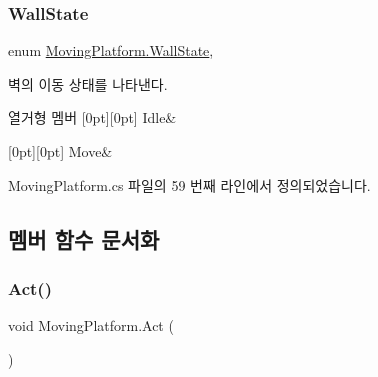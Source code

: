 \subsubsection{\texorpdfstring{WallState}{WallState}}
{\footnotesize\ttfamily enum \mbox{\hyperlink{class_moving_platform_ac47e764b71989317aab0bad26d82a901}{Moving\+Platform.\+Wall\+State}}\hspace{0.3cm}{\ttfamily [strong]}, {\ttfamily [private]}}



벽의 이동 상태를 나타낸다. 

\begin{DoxyEnumFields}{열거형 멤버}
[0pt][0pt]{}\mbox{\label{class_moving_platform_ac47e764b71989317aab0bad26d82a901ae599161956d626eda4cb0a5ffb85271c}} 
Idle&\\
\hline

[0pt][0pt]{}\mbox{\label{class_moving_platform_ac47e764b71989317aab0bad26d82a901a6bc362dbf494c61ea117fe3c71ca48a5}} 
Move&\\
\hline

\end{DoxyEnumFields}


Moving\+Platform.\+cs 파일의 59 번째 라인에서 정의되었습니다.


\begin{DoxyCode}{0}

\end{DoxyCode}


\subsection{멤버 함수 문서화}
\mbox{\label{class_moving_platform_ab4a3f15333f41ba4a3b9bc0227777460}} 
\subsubsection{\texorpdfstring{Act()}{Act()}}
{\footnotesize\ttfamily void Moving\+Platform.\+Act (\begin{DoxyParamCaption}{ }\end{DoxyParamCaption})\hspace{0.3cm}{\ttfamily [private]}}



